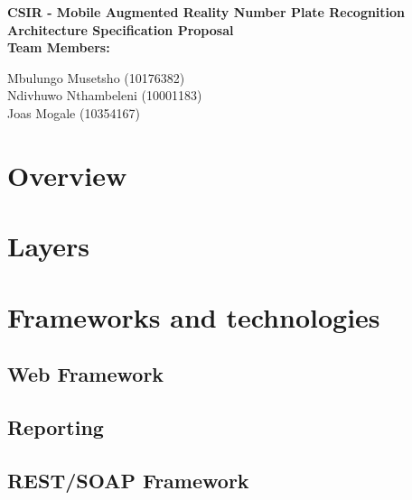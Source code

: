 \documentclass[12pt]{article}
\newcommand{\Title}{CSIR - Mobile Augmented Reality Number Plate Recognition} %
\begin{document}
        \vspace{4em}
        
        \begin{center}%
        
          \LARGE \bf \Title \\[4em]
          \LARGE {\bf Architecture Specification Proposal}\\[1em]
          \LARGE {\bf Team Members:}\\[2em]
          \large
          
             Mbulungo Musetsho                          (10176382) \\[1em]
             Ndivhuwo Nthambeleni (10001183)	\\[1em]
             Joas Mogale (10354167)		\\[1em]
            
        \end{center}%
        

        \newpage
        \tableofcontents    
                \newpage
                \section{Overview}
                \section{Layers}
                \section{Frameworks and technologies}
                
                	\subsection{Web Framework}
                	
                    \subsection{Reporting}
                    \subsection{REST/SOAP Framework}
                    
\end{document}
